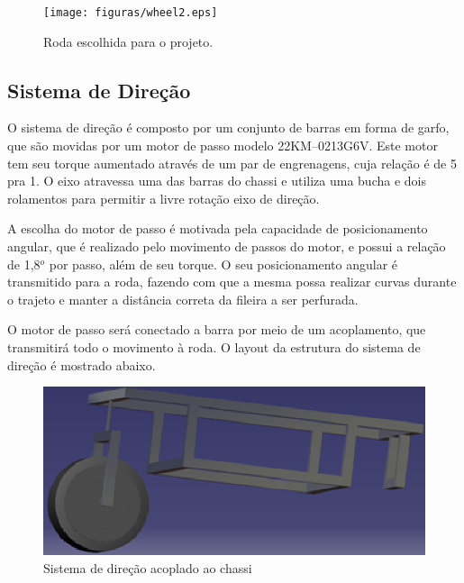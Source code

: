   \begin{figure}[!htbp]
  \begin{center}
  \texttt{[image: figuras/wheel2.eps]}
  \caption{\label{WHEEL}Roda escolhida para o projeto.}
  \end{center}
  \end{figure}

  \newpage
  \vfill
  \pagebreak

  \subsection{Sistema de Direção}
    O sistema de direção é composto por um conjunto de barras em forma de garfo, 
    que são movidas por um motor de passo modelo 22KM–0213G6V. Este motor tem seu torque aumentado através de um par de engrenagens, cuja relação é de 5 pra 1. O eixo atravessa uma das barras do chassi e utiliza uma bucha e dois rolamentos para permitir a livre rotação eixo de direção.  
     
    A escolha do motor de passo é motivada pela capacidade de posicionamento angular, que é realizado pelo movimento de passos do motor, e possui a relação de 1,8$^o$ por passo, além de seu torque. O seu posicionamento angular é transmitido para a roda, fazendo com que a mesma possa realizar curvas durante o trajeto e manter a distância correta da fileira a ser perfurada. 
    
    O motor de passo será conectado a barra por meio de um acoplamento, que transmitirá todo o movimento à roda. O layout da estrutura do sistema de direção é mostrado abaixo. 
    
        \begin{figure}[!htbp]
        	\begin{center}
        		\includegraphics[keepaspectratio=true,scale=1]{figuras/direcao1.eps}
        		\caption{Sistema de direção acoplado ao chassi}
        	\end{center}
        \end{figure}
    
